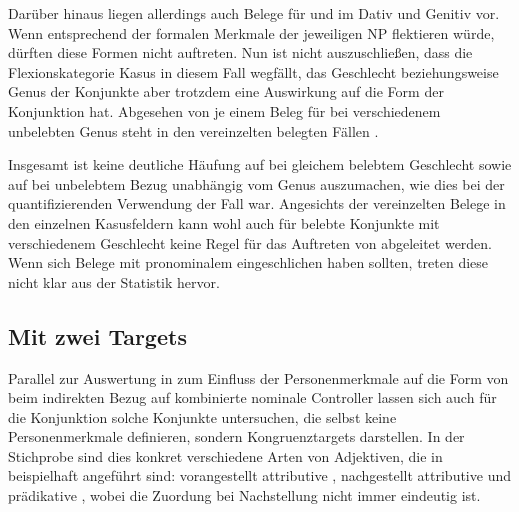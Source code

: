 Darüber hinaus liegen allerdings auch Belege für  und 
im Dativ und Genitiv vor. Wenn  entsprechend der formalen
Merkmale der jeweiligen NP flektieren würde, dürften diese Formen nicht
auftreten. Nun ist nicht auszuschließen, dass die Flexionskategorie Kasus in
diesem Fall wegfällt, das Geschlecht beziehungsweise Genus der Konjunkte aber
trotzdem eine Auswirkung auf die Form der Konjunktion hat. Abgesehen von je
einem Beleg für  bei verschiedenem unbelebten Genus steht in den
vereinzelten belegten Fällen .

Insgesamt ist keine deutliche Häufung auf  bei gleichem belebtem
Geschlecht sowie auf  bei unbelebtem Bezug unabhängig vom Genus
auszumachen, wie dies bei der quantifizierenden Verwendung der Fall war.
Angesichts der vereinzelten Belege in den einzelnen Kasusfeldern kann wohl auch
für belebte Konjunkte mit verschiedenem Geschlecht keine Regel für das
Auftreten von  abgeleitet werden. Wenn sich Belege mit
pronominalem  eingeschlichen haben sollten, treten diese nicht klar
aus der Statistik hervor.

\subsection{Mit zwei Targets}
\label{subsec:caobeidkoordtarg}

Parallel zur Auswertung in  zum Einfluss der
Personenmerkmale auf die Form von  beim indirekten Bezug auf
kombinierte nominale Controller lassen sich auch für die Konjunktion
 solche Konjunkte untersuchen, die selbst keine Personenmerkmale
definieren, sondern Kongruenz\-targets darstellen. In der Stichprobe sind dies
konkret verschiedene Arten von Adjektiven, die in 
beispielhaft angeführt sind: vorangestellt attributive
, nachgestellt attributive
 und prädikative ,
wobei die Zuordung bei Nachstellung nicht immer eindeutig ist.

